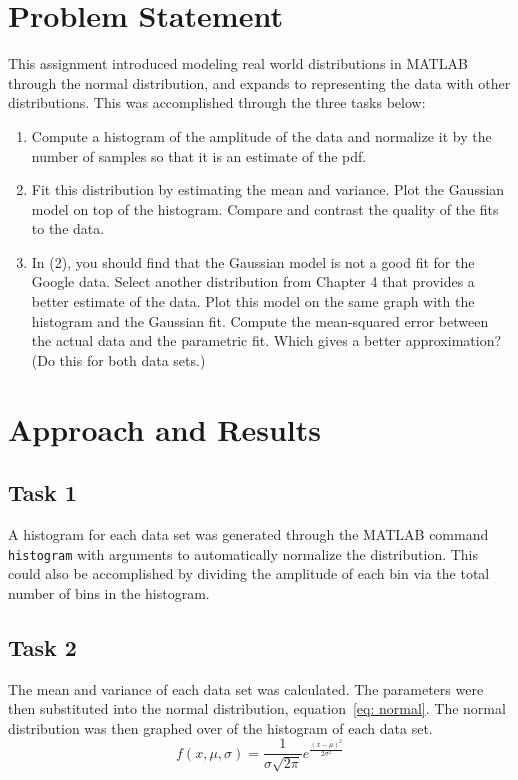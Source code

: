  
\usepackage{mcode}


\maketitle %

\section{Problem Statement} 
This assignment introduced modeling real world distributions in MATLAB through the normal distribution, and expands to representing the data with other distributions. This was accomplished through the three tasks below:
\begin{enumerate}
\item Compute a histogram of the amplitude of the data and normalize it by the number of samples so that it is an estimate of the pdf.
\item Fit this distribution by estimating the mean and variance. Plot the Gaussian model on top of the histogram. Compare and contrast the quality of the fits to the data.
\item In (2), you should find that the Gaussian model is not a good fit for the Google data. Select another distribution from Chapter 4 that provides a better estimate of the data. Plot this model on the same graph with the histogram and the Gaussian fit. Compute the mean-squared error between the actual data and the parametric fit. Which gives a better approximation? (Do this for both data sets.)
\end{enumerate}


\section{Approach and Results} 
\subsection*{Task 1} 
A histogram for each data set was generated through the MATLAB command \verb|histogram| with arguments to automatically normalize the distribution. This could also be accomplished by dividing the amplitude of each bin via the total number of bins in the histogram. 
\subsection*{Task 2}
The mean and variance of each data set was calculated. The parameters were then substituted into the normal distribution, equation~\ref{eq: normal}. The normal distribution was then graphed over of the histogram of each data set. 
\begin{equation}
f(x, \mu, \sigma) = \frac{1}{\sigma\sqrt{2\pi}}e^{\frac{(x-\mu)^2}{2\sigma^2}}
\label{eq: normal}
\end{equation}
